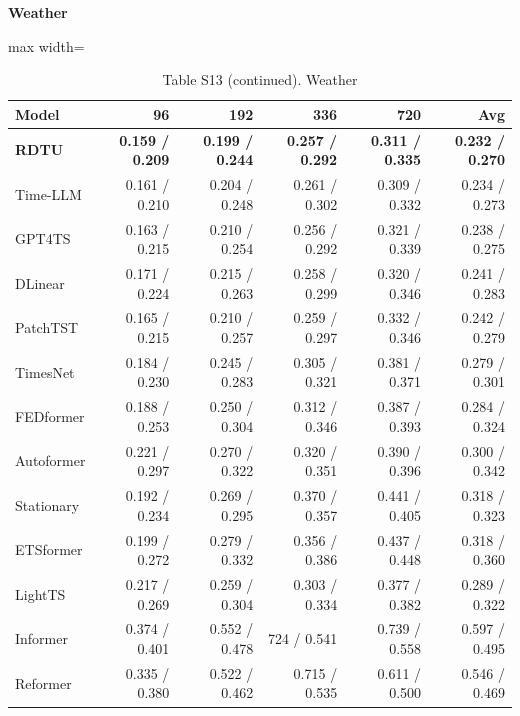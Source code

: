 \begin{table}[H]\centering\small
\caption*{Table S13 (continued). Weather}
\textbf{Weather}\par\smallskip
\begin{adjustbox}{max width=\linewidth}\begin{tabular}{lrrrrr}\toprule
\textbf{Model} & \textbf{96} & \textbf{192} & \textbf{336} & \textbf{720} & \textbf{Avg}\\\midrule
\rowcolor{blue!5}
\textbf{RDTU} & \textbf{0.159 / 0.209} & \textbf{0.199 / 0.244} & \textbf{0.257 / 0.292} & \textbf{0.311 / 0.335} & \textbf{0.232 / 0.270}\\
Time-LLM & 0.161 / 0.210 & 0.204 / 0.248 & 0.261 / 0.302 & 0.309 / 0.332 & 0.234 / 0.273\\
GPT4TS & 0.163 / 0.215 & 0.210 / 0.254 & 0.256 / 0.292 & 0.321 / 0.339 & 0.238 / 0.275\\
DLinear & 0.171 / 0.224 & 0.215 / 0.263 & 0.258 / 0.299 & 0.320 / 0.346 & 0.241 / 0.283\\
PatchTST & 0.165 / 0.215 & 0.210 / 0.257 & 0.259 / 0.297 & 0.332 / 0.346 & 0.242 / 0.279\\
TimesNet & 0.184 / 0.230 & 0.245 / 0.283 & 0.305 / 0.321 & 0.381 / 0.371 & 0.279 / 0.301\\
FEDformer & 0.188 / 0.253 & 0.250 / 0.304 & 0.312 / 0.346 & 0.387 / 0.393 & 0.284 / 0.324\\
Autoformer & 0.221 / 0.297 & 0.270 / 0.322 & 0.320 / 0.351 & 0.390 / 0.396 & 0.300 / 0.342\\
Stationary & 0.192 / 0.234 & 0.269 / 0.295 & 0.370 / 0.357 & 0.441 / 0.405 & 0.318 / 0.323\\
ETSformer & 0.199 / 0.272 & 0.279 / 0.332 & 0.356 / 0.386 & 0.437 / 0.448 & 0.318 / 0.360\\
LightTS & 0.217 / 0.269 & 0.259 / 0.304 & 0.303 / 0.334 & 0.377 / 0.382 & 0.289 / 0.322\\
Informer & 0.374 / 0.401 & 0.552 / 0.478 & 724 / 0.541 & 0.739 / 0.558 & 0.597 / 0.495\\
Reformer & 0.335 / 0.380 & 0.522 / 0.462 & 0.715 / 0.535 & 0.611 / 0.500 & 0.546 / 0.469\\
\bottomrule\end{tabular}\end{adjustbox}\end{table}
